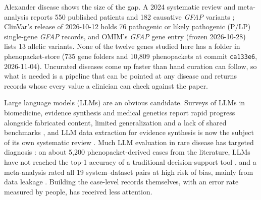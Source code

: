 \documentclass{article} %
\begin{document}
Alexander disease shows the size of the gap. A 2024 systematic review and meta-analysis reports 550 published patients and 182 causative \emph{GFAP} variants \citep{grossi2024_axd_meta}; ClinVar's release of 2026-10-12 holds 76 pathogenic or likely pathogenic (P/LP) single-gene \emph{GFAP} records, and OMIM's \emph{GFAP} gene entry (frozen 2026-10-28) lists 13 allelic variants. None of the twelve genes studied here has a folder in phenopacket-store (735 gene folders and 10,809 phenopackets at commit \texttt{ca133e6}, 2026-11-04). Uncurated diseases come up faster than hand curation can follow, so what is needed is a pipeline that can be pointed at any disease and returns records whose every value a clinician can check against the paper.

Large language models (LLMs) are an obvious candidate. Surveys of LLMs in biomedicine, evidence synthesis and medical genetics report rapid progress alongside fabricated content, limited generalization and a lack of shared benchmarks \citep{Tian2023OpportunitiesChallenges,Garcia2024ReviewScientific,Changalidis2026SystematicReview}, and LLM data extraction for evidence synthesis is now the subject of its own systematic review \citep{Shankar2026PerformanceLarge}. Much LLM evaluation in rare disease has targeted diagnosis \citep{Chen2024RarebenchCan}: on about 5,200 phenopacket-derived cases from the literature, LLMs have not reached the top-1 accuracy of a traditional decision-support tool \citep{reese2026_llm_vs_exomiser}, and a meta-analysis rated all 19 system--dataset pairs at high risk of bias, mainly from data leakage \citep{nguyen2026_llm_rd_metaanalysis}. Building the case-level records themselves, with an error rate measured by people, has received less attention.
\end{document}
